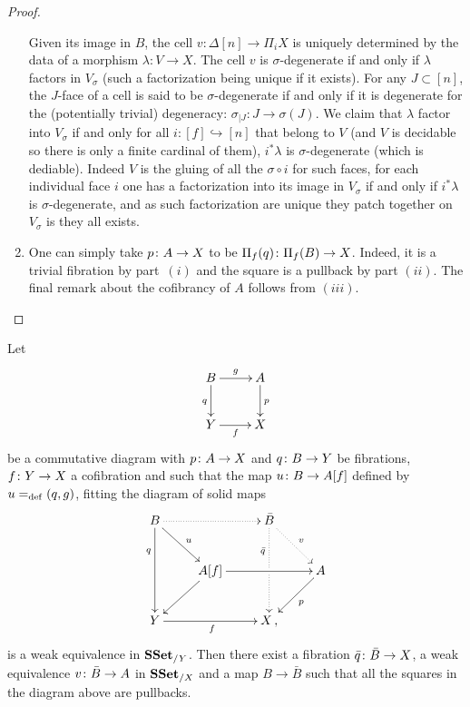 \documentclass[reqno,10pt,a4paper,oneside,draft]{amsart}
\begin{document}
\begin{proof}
\begin{enumerate}[$(i)$]
Given its image in $B$, the cell $v: \Delta[n] \rightarrow \Pi_i X$ is uniquely determined by the data of a morphism $\lambda: V\rightarrow X$. The cell $v$ is $\sigma$-degenerate if and only if $\lambda$ factors in $V_{\sigma}$ (such a factorization being unique if it exists). For any $J \subset [n]$, the $J$-face of a cell is said to be $\sigma$-degenerate if and only if it is degenerate for the (potentially trivial) degeneracy: $\sigma_{|J} : J \rightarrow \sigma(J)$. We claim that $\lambda$ factor into $V_{\sigma}$ if and only for all $i:[f] \hookrightarrow [n]$ that belong to $V$ (and $V$ is decidable so there is only a finite cardinal of them), $i^* \lambda$ is $\sigma$-degenerate (which is dediable). Indeed $V$ is the gluing of all the $\sigma \circ i$ for such faces, for each individual face $i$ one has a factorization into its image in $V_{\sigma}$ if and only if $i^* \lambda$ is $\sigma$-degenerate, and as such factorization are unique they patch together on $V_{\sigma}$ is they all exists.

\item One can simply take $p \colon A \to X$ to be $\Pi_f(q) \colon \Pi_f(B) \to X$. Indeed, it is a trivial fibration by part~$(i)$ and the square is a pullback by part $(ii)$. The final remark about the cofibrancy of 
$A$ follows from $(iii)$. \qedhere
\end{enumerate}
\end{proof}





\begin{proposition}
\label{Prop:Homotopy_ext_prop}
Let 
\[
\xymatrix{
B \ar[r]^g \ar[d]_q & A \ar[d]^p \\
Y \ar[r]_f & X}
\]
be a commutative diagram with $p \colon A \to X$ and $q \colon B \to Y$ be fibrations, $f \colon Y \to X$ 
a cofibration and such that the map $u \colon B \to A[f]$ defined by $u =_{\operatorname{def}} (q, g)$, fitting the diagram 
of solid maps
\[ 
\xymatrix{
 B
  \ar@{.>}[rr]
  \ar[dr]^{u}
  \ar[dd]_(.3){q}
&&
  \bar{B}
  \ar@{.>}[dr]^{v}
  \ar@{.>}[dd]_(.3){\bar{q}}|{\hole}
&\\&
  A[f] 
  \ar[rr]
  \ar[dl]
&&
  A
  \ar[dl]^{p}
\\
  Y
  \ar[rr]_{f}
&&
  X \, ,
&
}
\]
is a weak equivalence in $\mathbf{SSet}_{/ Y}$. Then there exist a fibration $\bar{q} \colon \bar{B} \to X$, a weak equivalence $v \colon \bar{B} \to A$ in $\mathbf{SSet}_{/X}$ and a map $B \to \bar{B}$ such that all the squares in the diagram above are pullbacks. 
\end{proposition}
\end{document}
